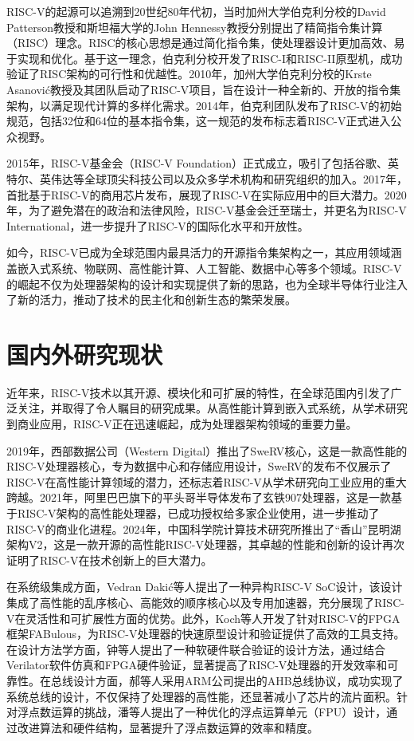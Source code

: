 RISC-V的起源可以追溯到20世纪80年代初，当时加州大学伯克利分校的David Patterson教授和斯坦福大学的John Hennessy教授分别提出了精简指令集计算（RISC）理念\cite{cocke1990evolution}。RISC的核心思想是通过简化指令集，使处理器设计更加高效、易于实现和优化。基于这一理念，伯克利分校开发了RISC-I和RISC-II原型机，成功验证了RISC架构的可行性和优越性。2010年，加州大学伯克利分校的Krste Asanović教授及其团队启动了RISC-V项目，旨在设计一种全新的、开放的指令集架构，以满足现代计算的多样化需求\cite{waterman2011risc}。2014年，伯克利团队发布了RISC-V的初始规范，包括32位和64位的基本指令集\cite{asanovic2014instruction}，这一规范的发布标志着RISC-V正式进入公众视野。

2015年，RISC-V基金会（RISC-V Foundation）正式成立，吸引了包括谷歌、英特尔、英伟达等全球顶尖科技公司以及众多学术机构和研究组织的加入。2017年，首批基于RISC-V的商用芯片发布，展现了RISC-V在实际应用中的巨大潜力。2020年，为了避免潜在的政治和法律风险，RISC-V基金会迁至瑞士，并更名为RISC-V International，进一步提升了RISC-V的国际化水平和开放性。

如今，RISC-V已成为全球范围内最具活力的开源指令集架构之一，其应用领域涵盖嵌入式系统、物联网、高性能计算、人工智能、数据中心等多个领域。RISC-V的崛起不仅为处理器架构的设计和实现提供了新的思路，也为全球半导体行业注入了新的活力，推动了技术的民主化和创新生态的繁荣发展。


\section{国内外研究现状}
近年来，RISC-V技术以其开源、模块化和可扩展的特性，在全球范围内引发了广泛关注，并取得了令人瞩目的研究成果。从高性能计算到嵌入式系统，从学术研究到商业应用，RISC-V正在迅速崛起，成为处理器架构领域的重要力量。

2019年，西部数据公司（Western Digital）推出了SweRV核心，这是一款高性能的RISC-V处理器核心，专为数据中心和存储应用设计，SweRV的发布不仅展示了RISC-V在高性能计算领域的潜力，还标志着RISC-V从学术研究向工业应用的重大跨越\cite{marena2019risc}。2021年，阿里巴巴旗下的平头哥半导体发布了玄铁907处理器，这是一款基于RISC-V架构的高性能处理器，已成功授权给多家企业使用，进一步推动了RISC-V的商业化进程\cite{JCDI202106005}。2024年，中国科学院计算技术研究所推出了``香山''昆明湖架构V2，这是一款开源的高性能RISC-V处理器，其卓越的性能和创新的设计再次证明了RISC-V在技术创新上的巨大潜力\cite{JFYZ202303014}。

在系统级集成方面，Vedran Dakić等人提出了一种异构RISC-V SoC设计，该设计集成了高性能的乱序核心、高能效的顺序核心以及专用加速器，充分展现了RISC-V在灵活性和可扩展性方面的优势\cite{electronics13173494}。此外，Koch等人开发了针对RISC-V的FPGA框架FABulous，为RISC-V处理器的快速原型设计和验证提供了高效的工具支持\cite{10.1145/3431920}。在设计方法学方面，钟等人提出了一种软硬件联合验证的设计方法，通过结合Verilator软件仿真和FPGA硬件验证，显著提高了RISC-V处理器的开发效率和可靠性\cite{SDDZ202411008}。在总线设计方面，郝等人采用ARM公司提出的AHB总线协议，成功实现了系统总线的设计，不仅保持了处理器的高性能，还显著减小了芯片的流片面积\cite{JSGG202020007}。针对浮点数运算的挑战，潘等人提出了一种优化的浮点运算单元（FPU）设计，通过改进算法和硬件结构，显著提升了浮点数运算的效率和精度\cite{JSGG202103009}。

